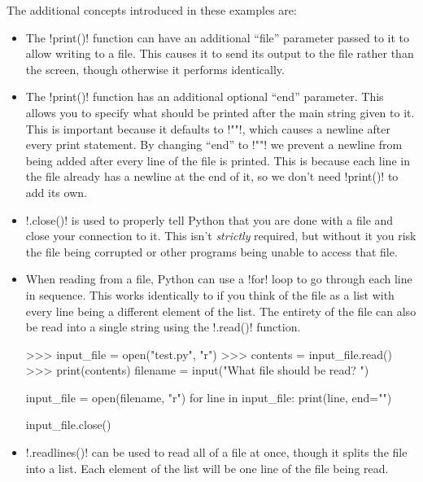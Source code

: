 \documentclass[11pt]{cselabheader}
\begin{document}
The additional concepts introduced in these examples are:

\begin{itemize}
\item The \pythoninline!print()! function can have an additional ``file'' parameter
  passed to it to allow writing to a file. This causes it to send its output to
  the file rather than the screen, though otherwise it performs identically.

\item The \pythoninline!print()! function has an additional optional ``end''
  parameter. This allows you to specify what should be printed after the main
  string given to it. This is important because it defaults to \pythoninline!"\n"!,
  which causes a newline after every print statement. By changing ``end'' to
  \pythoninline!""! we prevent a newline from being added after every line of the
  file is printed. This is because each line in the file already has a newline
  at the end of it, so we don't need \pythoninline!print()! to add its own.

\item \pythoninline!.close()! is used to properly tell Python that you are done
  with a file and close your connection to it. This isn't \emph{strictly}
  required, but without it you risk the file being corrupted or other programs
  being unable to access that file.

\item When reading from a file, Python can use a \pythoninline!for! loop to go
  through each line in sequence. This works identically to if you think of the
  file as a list with every line being a different element of the list. The
  entirety of the file can also be read into a single string using the
  \pythoninline!.read()! function.

\begin{pyconcode}
>>> input_file = open("test.py", "r")
>>> contents = input_file.read()
>>> print(contents)
filename = input("What file should be read? ")

input_file = open(filename, "r")
for line in input_file:
    print(line, end="")

input_file.close()
\end{pyconcode}

\item \pythoninline!.readlines()! can be used to read all of a file at once, though
  it splits the file into a list. Each element of the list will be one line of
  the file being read.
\end{itemize}
\end{document}
